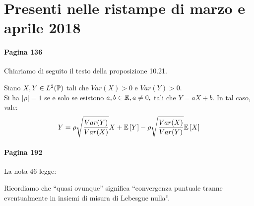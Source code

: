 \section*{Presenti nelle ristampe di marzo e aprile 2018}
\paragraph{Pagina 136} Chiariamo di seguito il testo della proposizione 10.21.

Siano $X,Y \in L^2(\mathbb P)$ tali che $Var(X)>0$ e $Var(Y)>0$. \\
Si ha $|\rho| = 1$ se e solo se esistono $a, b \in \mathbb R, a \neq 0,$ tali che $Y = aX + b$. In tal caso, vale:
  $$Y =
  \rho \sqrt{\dfrac{Var(Y)}{Var(X)}}X + \mathbb E \left[ Y \right] -
  \rho \sqrt{\dfrac{Var(X)}{Var(Y)}} \mathbb E \left[ X \right]$$

\paragraph{Pagina 192} La nota 46 legge:

Ricordiamo che ``quasi ovunque'' significa ``convergenza puntuale tranne eventualmente in insiemi di misura di Lebesgue nulla''.
